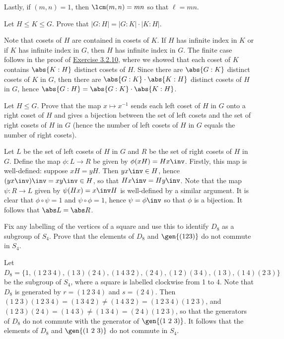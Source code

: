 \begin{problems}
\begin{sol}
        Lastly, if $(m, n) = 1$, then $\lcm(m, n) = mn$ so that $\ell = mn$.
    \end{sol}
    \item \label{ex3.2.11} Let $H \leq K \leq G$. Prove that $|G : H| = |G : K| \cdot |K : H|$. 
    \begin{sol}
        Note that cosets of $H$ are contained in cosets of $K$. If $H$ has infinite index in $K$ or if $K$ has infinite index in $G$, then $H$ has infinite index in $G$. The finite case follows in the proof of \hyperref[ex3.2.10]{Exercise 3.2.10}, where we showed that each coset of $K$ contains $\abs{K : H}$ distinct cosets of $H$. Since there are $\abs{G : K}$ distinct cosets of $K$ in $G$, then there are $\abs{G : K} \cdot \abs{K : H}$ distinct cosets of $H$ in $G$, hence $\abs{G : H} = \abs{G : K} \cdot \abs{K : H}$.
    \end{sol}
    \item Let $H \leq G$. Prove that the map $x \mapsto x^{-1}$ sends each left coset of $H$ in $G$ onto a right coset of $H$ and gives a bijection between the set of left cosets and the set of right cosets of $H$ in $G$ (hence the number of left cosets of $H$ in $G$ equals the number of right cosets).
    \begin{sol}
        Let $L$ be the set of left cosets of $H$ in $G$ and $R$ be the set of right cosets of $H$ in $G$. Define the map $\phi : L \to R$ be given by $\phi(xH) = Hx\inv$. Firstly, this map is well-defined: suppose $xH = yH$. Then $yx\inv \in H$, hence $(yx\inv)\inv = xy\inv \in H$, so that $Hx\inv = Hy\inv$. Note that the map $\psi : R \to L$ given by $\psi(Hx) = x\inv H$ is well-defined by a similar argument. It is clear that $\phi \circ \psi = 1$ and $\psi \circ \phi = 1$, hence $\psi = \phi\inv$ so that $\phi$ is a bijection. It follows that $\abs L = \abs R$.
    \end{sol}
    \item Fix any labelling of the vertices of a square and use this to identify $D_8$ as a subgroup of $S_4$. Prove that the elements of $D_8$ and $\gen{(123)}$ do not commute in $S_4$.
    \begin{sol}
        Let $D_8 = \{1, (1\ 2\ 3\ 4), (1\ 3)(2\ 4), (1\ 4\ 3\ 2), (2\ 4), (1\ 2)(3\ 4), (1\ 3), (1\ 4)(2\ 3)\}$ be the subgroup of $S_4$, where a square is labelled clockwise from 1 to 4. Note that $D_8$ is generated by $r = (1\ 2\ 3\ 4)$ and $s = (2\ 4)$. Then $(1\ 2\ 3)(1\ 2\ 3\ 4) = (1\ 3\ 4\ 2) \neq (1\ 4\ 3\ 2) = (1\ 2\ 3\ 4)(1\ 2\ 3)$, and $(1\ 2\ 3)(2\ 4) = (1\ 4\ 3) \neq (1\ 3\ 4) = (2\ 4)(1\ 2\ 3)$, so that the generators of $D_8$ do not commute with the generator of $\gen{(1\ 2\ 3)}$. It follows that the elements of $D_8$ and $\gen{(1\ 2\ 3)}$ do not commute in $S_4$.

\end{sol}
\end{problems}

